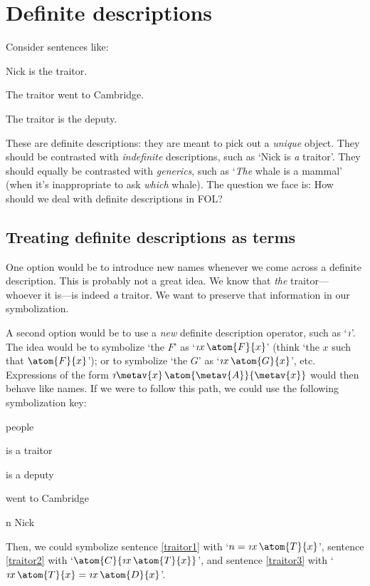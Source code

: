 \chapter{Definite descriptions}\label{subsec.defdesc}
Consider sentences like:
	\begin{earg}
		\item[\ex{traitor1}] Nick is the traitor.
		\item[\ex{traitor2}] The traitor went to Cambridge.
		\item[\ex{traitor3}] The traitor is the deputy.
	\end{earg}
These are definite descriptions: they are meant to pick out a \emph{unique} object. They should be contrasted with \emph{indefinite} descriptions, such as `Nick  is \emph{a} traitor'. They should equally be contrasted with \emph{generics}, such as `\emph{The} whale is a mammal' (when it's inappropriate to ask \emph{which} whale). The question we face is: How should we deal with definite descriptions in FOL?


\section{Treating definite descriptions as terms}
One option would be to introduce new names whenever we come across a definite description. This is probably not a great idea. We know that \emph{the} traitor---whoever it is---is indeed \emph{a} traitor. We want to preserve that information in our symbolization.

A second option would be to use a \emph{new} definite description operator, such as `$\maththe$'. The idea would be to symbolize `the $F$' as `$\maththe x\,\atom{F}{x}$'  (think `the $x$ such that $\atom{F}{x}$'); or to symbolize `the $G$' as `$\maththe x\,\atom{G}{x}$', etc. Expressions of the form $\maththe \metav{x}\, \atom{\metav{A}}{\metav{x}}$ would then behave like names. If we were to follow this path, we could use the following symbolization key:
	\begin{ekey}
		\item[\text{domain}] people
		\item[\atom{T}{x}]  is a traitor
		\item[\atom{D}{x}]  is a deputy
		\item[\atom{C}{x}]  went to Cambridge
		\item[n] Nick
	\end{ekey}
Then, we could symbolize sentence \ref{traitor1} with `$n = \maththe x\, \atom{T}{x}$', sentence \ref{traitor2} with `$\atom{C}{\maththe x\,\atom{T}{x}}$', and sentence \ref{traitor3} with `$\maththe x\, \atom{T}{x} = \maththe x\, \atom{D}{x}$'.

